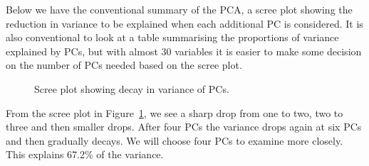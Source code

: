 \documentclass[
  letterpaper,
]{krantz}
\begin{document}
Below we have the conventional summary of the PCA, a scree plot showing
the reduction in variance to be explained when each additional PC is
considered. It is also conventional to look at a table summarising the
proportions of variance explained by PCs, but with almost 30 variables
it is easier to make some decision on the number of PCs needed based on
the scree plot.

\begin{figure}


\caption{\label{fig-aflw-pca}Scree plot showing decay in variance of
PCs.}

\end{figure}%


From the scree plot in Figure~\ref{fig-aflw-pca}, we see a sharp drop
from one to two, two to three and then smaller drops. After four PCs the
variance drops again at six PCs and then gradually decays. We will
choose four PCs to examine more closely. This explains 67.2\% of the
variance.
\end{document}
